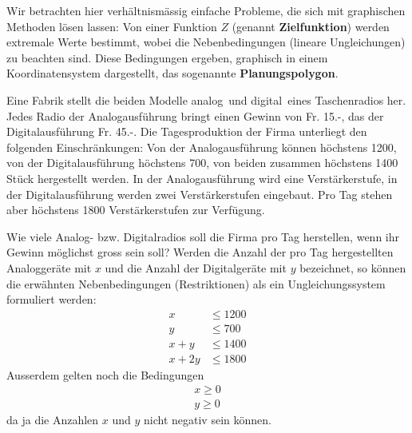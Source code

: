 \documentclass[%
11pt,%
twoside,%
titlepage,%
german,%
headsepline%
]{scrartcl}
\begin{document}
Wir betrachten hier verh\"altnism\"assig einfache Probleme, die sich mit graphischen Methoden l\"osen lassen: Von einer Funktion $Z$ (genannt \textbf{Ziel\-funk\-tion}) werden extremale Werte bestimmt, wobei die Nebenbedingungen (lineare Ungleichungen) zu beachten sind. Diese Bedingungen ergeben, graphisch in einem Koordinatensystem dargestellt, das sogenannte \textbf{Planungspolygon}.

\begin{bsp}
Eine Fabrik stellt die beiden Modelle \glqq analog\grqq\ und \glqq digital\grqq\ eines Taschenradios her. Jedes Radio der Analogausf\"uhrung bringt einen Gewinn von Fr. 15.-, das der Digitalausf\"uhrung Fr. 45.-.
Die Tagesproduktion der Firma unterliegt den folgenden Einschr\"ankungen: Von der Analogausf\"uhrung k\"onnen h\"ochstens 1200, von der Digitalausf\"uhrung h\"ochstens 700, von beiden zusammen h\"ochstens 1400 St\"uck hergestellt werden. In der Analogausf\"uhrung wird eine Verst\"arkerstufe, in der Digitalausf\"uhrung werden zwei Verst\"arkerstufen eingebaut. Pro Tag stehen aber h\"ochstens 1800 Verst\"arkerstufen zur Verf\"ugung.

Wie viele Analog- bzw. Digitalradios soll die Firma pro Tag herstellen, wenn ihr Gewinn m\"oglichst gross sein soll?
Werden die Anzahl der pro Tag hergestellten Analogger\"ate mit $x$ und die Anzahl der Digitalger\"ate mit $y$ bezeichnet, so k\"onnen die erw\"ahnten Nebenbedingungen (Restriktionen) als ein Ungleichungssystem formuliert werden:
\begin{align}
x&\leq1200\\
y&\leq700\\
x+y&\leq1400\\
x+2y&\leq1800
\end{align}
Ausserdem gelten noch die Bedingungen
\begin{align*}
x\geq0\\
y\geq0
\end{align*}
da ja die Anzahlen $x$ und $y$ nicht negativ sein k\"onnen.


\end{bsp}
\end{document}
